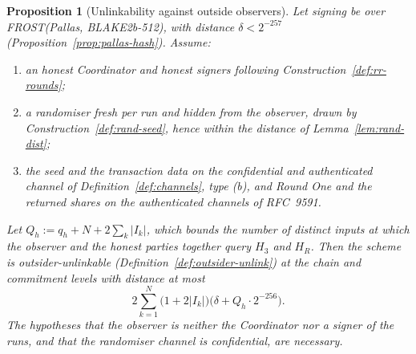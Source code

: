 \documentclass[11pt,a4paper]{article}
\newtheorem{proposition}[theorem]{Proposition}
\theoremstyle{definition}
\begin{document}
\begin{proposition}[Unlinkability against outside observers]
\label{prop:rr-unlink}
Let signing be over FROST(Pallas, BLAKE2b-512), with distance
\(\delta < 2^{-257}\) (Proposition~\ref{prop:pallas-hash}). Assume:
\begin{enumerate}
\item[(1)] an honest Coordinator and honest signers following
  Construction~\ref{def:rr-rounds};
\item[(2)] a randomiser fresh per run and hidden from the observer, drawn by
  Construction~\ref{def:rand-seed}, hence within the distance of
  Lemma~\ref{lem:rand-dist};
\item[(3)] the seed and the transaction data on the
  confidential and authenticated channel of Definition~\ref{def:channels},
  type (b), and Round One and the returned shares on the authenticated
  channels of RFC~9591.
\end{enumerate}
Let \(Q_h := q_h + N + 2 \sum_k \lvert I_k \rvert\), which bounds the
number of distinct inputs at which the observer and the honest parties
together query \(H_3\) and \(H_R\). Then the scheme is outsider-unlinkable
(Definition~\ref{def:outsider-unlink}) at the chain and commitment levels
with distance at most
\[
  2 \sum_{k=1}^{N} \bigl(1 + 2 \lvert I_k \rvert\bigr)
    \bigl(\delta + Q_h \cdot 2^{-256}\bigr) .
\]
The hypotheses that the observer is neither the Coordinator nor a signer of
the runs, and that the randomiser channel is confidential, are necessary.
\end{proposition}
\end{document}
